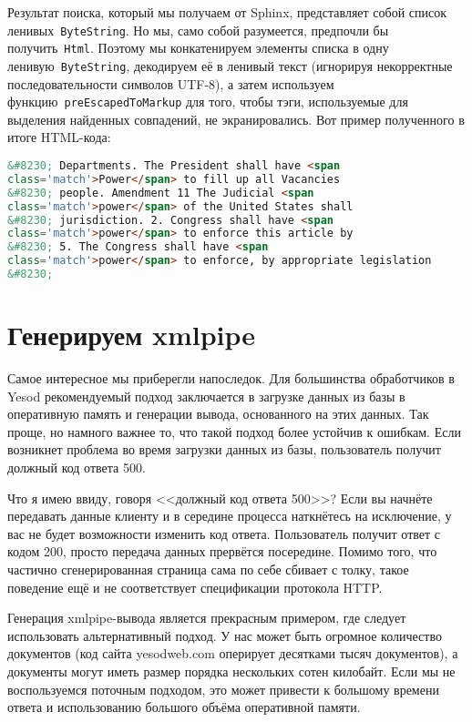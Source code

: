 Результат поиска, который мы получаем от Sphinx, представляет собой список
ленивых~\lstinline'ByteString'. Но мы, само собой разумеется, предпочли бы получить~\lstinline'Html'. Поэтому мы конкатенируем элементы списка в одну ленивую~\lstinline'ByteString', декодируем её в ленивый текст (игнорируя некорректные последовательности символов UTF-8), а затем используем функцию~\lstinline'preEscapedToMarkup' для того, чтобы тэги, используемые для выделения найденных совпадений, не экранировались. Вот пример полученного в итоге HTML-кода:
\begin{lstlisting}[language=HTML]
&#8230; Departments. The President shall have <span
class='match'>Power</span> to fill up all Vacancies
&#8230; people. Amendment 11 The Judicial <span
class='match'>power</span> of the United States shall
&#8230; jurisdiction. 2. Congress shall have <span
class='match'>power</span> to enforce this article by
&#8230; 5. The Congress shall have <span
class='match'>power</span> to enforce, by appropriate legislation
&#8230;
\end{lstlisting}

\section{Генерируем xmlpipe}
Самое интересное мы приберегли напоследок. Для большинства обработчиков в Yesod рекомендуемый подход заключается в загрузке данных из базы в оперативную память и генерации вывода, основанного на этих данных. Так проще, но намного важнее то, что такой подход более устойчив к ошибкам. Если возникнет проблема во время загрузки данных из базы, пользователь получит должный код ответа 500.

\begin{remark}
Что я имею ввиду, говоря <<должный код ответа 500>>? Если вы начнёте передавать данные клиенту и в середине процесса наткнётесь на исключение, у вас не будет возможности изменить код ответа. Пользователь получит ответ с кодом 200, просто передача данных прервётся посередине. Помимо того, что частично сгенерированная страница сама по себе сбивает с толку, такое поведение ещё и не соответствует спецификации протокола HTTP.
\end{remark}

Генерация xmlpipe-вывода является прекрасным примером, где следует использовать альтернативный подход. У нас может быть огромное количество документов (код сайта yesodweb.com оперирует десятками тысяч документов), а документы могут иметь размер порядка нескольких сотен килобайт. Если мы не воспользуемся поточным подходом, это может привести к большому времени ответа и использованию большого объёма оперативной памяти.

